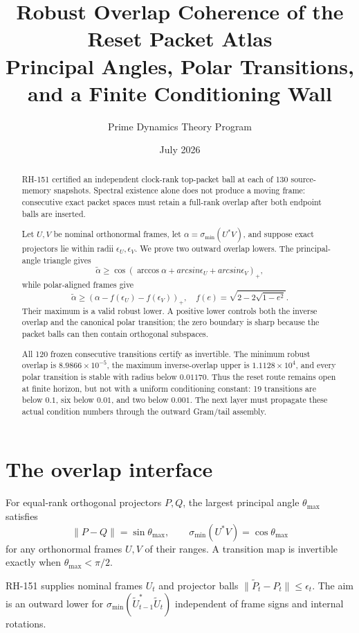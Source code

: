 \documentclass[12pt]{article}
\title{Robust Overlap Coherence of the Reset Packet Atlas\\\large Principal Angles, Polar Transitions, and a Finite Conditioning Wall}
\author{Prime Dynamics Theory Program}
\date{July 2026}
\begin{document}
\maketitle

\begin{abstract}
RH-151 certified an independent clock-rank top-packet ball at each of 130
source-memory snapshots.  Spectral existence alone does not produce a moving
frame: consecutive exact packet spaces must retain a full-rank overlap after
both endpoint balls are inserted.

Let $U,V$ be nominal orthonormal frames, let
$\alpha=\sigma_{\min}(U^*V)$, and suppose exact projectors lie within radii
$\epsilon_U,\epsilon_V$.  We prove two outward overlap lowers.  The
principal-angle triangle gives
\[
 \widetilde\alpha\geq
 \cos\!\left(\arccos\alpha+arcsin\epsilon_U+arcsin\epsilon_V\right)_+,
\]
while polar-aligned frames give
\[
 \widetilde\alpha\geq
 \left(\alpha-f(\epsilon_U)-f(\epsilon_V)\right)_+,
 \quad f(e)=\sqrt{2-2\sqrt{1-e^2}}.
\]
Their maximum is a valid robust lower.  A positive lower controls both the
inverse overlap and the canonical polar transition; the zero boundary is
sharp because the packet balls can then contain orthogonal subspaces.

All 120 frozen consecutive transitions certify as invertible.  The minimum
robust overlap is $8.9866\times10^{-5}$, the maximum inverse-overlap upper is
$1.1128\times10^4$, and every polar transition is stable with radius below
$0.01170$.  Thus the reset route remains open at finite horizon, but not with
a uniform conditioning constant: 19 transitions are below $0.1$, six below
$0.01$, and two below $0.001$.  The next layer must propagate these actual
condition numbers through the outward Gram/tail assembly.
\end{abstract}

\section{The overlap interface}
For equal-rank orthogonal projectors $P,Q$, the largest principal angle
$\theta_{\max}$ satisfies
\[
 \|P-Q\|=\sin\theta_{\max},\qquad
 \sigma_{\min}(U^*V)=\cos\theta_{\max}
\]
for any orthonormal frames $U,V$ of their ranges.  A transition map is
invertible exactly when $\theta_{\max}<\pi/2$.

RH-151 supplies nominal frames $U_t$ and projector balls
$\|\widetilde P_t-P_t\|\leq\epsilon_t$.  The aim is an outward lower for
$\sigma_{\min}(\widetilde U_{t-1}^*\widetilde U_t)$ independent of frame
signs and internal rotations.
\end{document}
